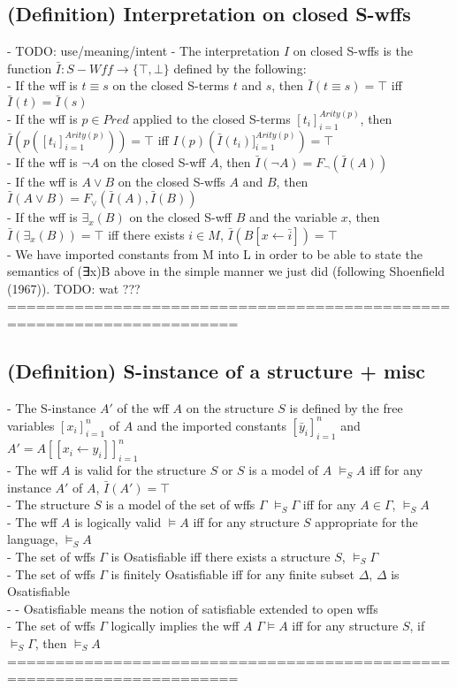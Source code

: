 \documentclass{article}
\begin{document}
\subsection{(Definition) Interpretation on closed S-wffs}
	- TODO: use/meaning/intent
	- The interpretation $I$ on closed S-wffs is the function $\bar I: S-Wff \rightarrow \{\top, \bot\}$ defined by the following: \\
		- If the wff is $t \equiv s$ on the closed S-terms $t$ and $s$, then $\bar I(t \equiv s) = \top$ iff $\bar I(t) = \bar I(s)$ \\
		- If the wff is $p \in Pred$ applied to the closed S-terms $[t_i]_{i=1}^{Arity(p)}$, then $\bar I\left(p([t_i]_{i=1}^{Arity(p)})\right) = \top$ iff $I(p)\left(\bar I(t_i)]_{i=1}^{Arity(p)}\right) = \top$ \\
		- If the wff is $\lnot A$ on the closed S-wff $A$, then $\bar I(\lnot A) = F_\lnot(\bar I(A))$ \\
		- If the wff is $A \lor B$ on the closed S-wffs $A$ and $B$, then $\bar I(A \lor B) = F_\lor(\bar I(A), \bar I(B))$ \\
		- If the wff is $\exists_x(B)$ on the closed S-wff $B$ and the variable $x$, then $\bar I(\exists_x(B)) = \top$ iff there exists $i \in M$, $\bar I(B[x \leftarrow \bar i]) = \top$ \\
	- We have imported constants from M into L in order to be able to state the semantics of (∃x)B above in the simple manner we just did (following Shoenﬁeld (1967)). TODO: wat ??? \\
	======================================================================
\subsection{(Definition) S-instance of a structure + misc}
	- The S-instance $A'$ of the wff $A$ on the structure $S$ is defined by the free variables $[x_i]_{i=1}^n$ of $A$ and the imported constants $[\bar y_i]_{i=1}^n$ and $A' = A[[x_i \leftarrow y_i]]_{i=1}^n$ \\
	- The wff $A$ is valid for the structure $S$ or $S$ is a model of $A$ $\vDash_S A$ iff for any instance $A'$ of $A$, $\bar I(A') = \top$ \\
	- The structure $S$ is a model of the set of wffs $\Gamma$ $\vDash_S \Gamma$ iff for any $A \in \Gamma$, $\vDash_S A$ \\
	- The wff $A$ is logically valid $\vDash A$ iff for any structure $S$ appropriate for the language, $\vDash_S A$ \\
	- The set of wffs $\Gamma$ is Osatisfiable iff there exists a structure $S$, $\vDash_S \Gamma$ \\
	- The set of wffs $\Gamma$ is finitely Osatisfiable iff for any finite subset $\Delta$, $\Delta$ is Osatisfiable \\
		- - Osatisfiable means the notion of satisfiable extended to open wffs \\
	- The set of wffs $\Gamma$ logically implies the wff $A$ $\Gamma \vDash A$ iff for any structure $S$, if $\vDash_S \Gamma$, then $\vDash_S A$ \\
	======================================================================
\end{document}
